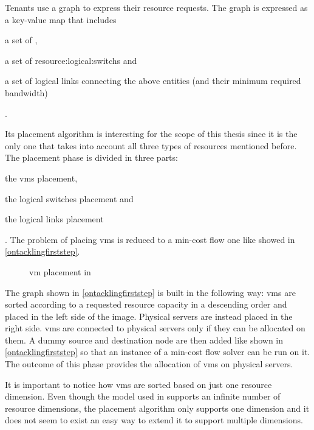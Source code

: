 Tenants use a graph to express their resource requests.
The graph is expressed as a key-value map that includes
\begin{mylist}
    \item a set of ,
    \item a set of \glspl{resource:logical:switch} and
    \item a set of logical links connecting the above entities (and their minimum required bandwidth)
\end{mylist}.

Its placement algorithm is interesting for the scope of this thesis since it is the only one that takes into account all three types of resources mentioned before.
The placement phase is divided in three parts:
\begin{mylist}
    \item the \glspl{vm} placement,
    \item the logical switches placement and
    \item the logical links placement
\end{mylist}.
The problem of placing \glspl{vm} is reduced to a min-cost flow one like showed in \autoref{ontacklingfirststep}.

\begin{figure}[!htb]
    \centering
    \usebox{\ontacklingfirststep}
    \caption{\gls{vm} placement in \cite{ontackling}}
    \label{ontacklingfirststep}
\end{figure}

The graph shown in \autoref{ontacklingfirststep} is built in the following way: \glspl{vm} are sorted according to a requested resource capacity in a descending order and placed in the left side of the image.
Physical servers are instead placed in the right side.
\glspl{vm} are connected to physical servers only if they can be allocated on them.
A dummy source and destination node are then added like shown in \autoref{ontacklingfirststep} so that an instance of a min-cost flow solver can be run on it.
The outcome of this phase provides the allocation of \glspl{vm} on physical servers.

It is important to notice how \glspl{vm} are sorted based on just one resource dimension.
Even though the model used in \cite{ontackling} supports an infinite number of resource dimensions, the placement algorithm only supports one dimension and it does not seem to exist an easy way to extend it to support multiple dimensions.

